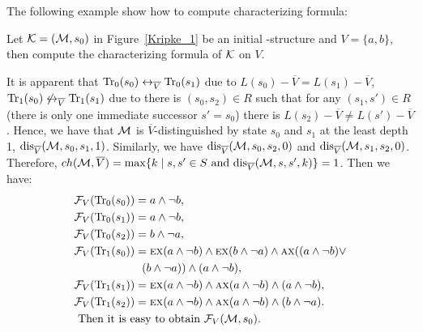 \documentclass{article}
\begin{document}
The following example show how to compute characterizing formula:
\begin{example}
Let ${\cal K} = ({\cal M}, s_0)$ in Figure~\ref{Kripke_1} be an initial \MPK-structure and $V=\{a, b\}$, then compute the characterizing formula of ${\cal K}$ on $V$.

It is apparent that $\textrm{Tr}_0(s_0) \leftrightarrow_{\overline V} \textrm{Tr}_0(s_1)$ due to $L(s_0) - \overline V = L(s_1) - \overline V$, $\textrm{Tr}_1(s_0) \not\leftrightarrow_{\overline V} \textrm{Tr}_1(s_1)$ due to there is $(s_0, s_2)\in R$ such that for any $(s_1, s') \in R$ (there is only one immediate successor $s'=s_0$) there is $L(s_2)- \overline V \neq L(s') - \overline V$. Hence, we have that ${\cal M}$ is $\overline V$-distinguished by state $s_0$ and $s_1$ at the least depth 1, \ie $\textrm{dis}_{\overline V}({\cal M}, s_0, s_1, 1)$. Similarly, we have $\textrm{dis}_{\overline V}({\cal M}, s_0, s_2, 0)$ and $\textrm{dis}_{\overline V}({\cal M}, s_1, s_2, 0)$. Therefore, $ch({\cal M}, \overline V) =  \max\{k\mid s,s'\in S \text{ and } \textrm{dis}_{\overline V}({\cal M},s,s',k)\} = 1$.
Then we have:
\begin{align*}
  & {\cal F}_V(\textrm{Tr}_0(s_0)) = a \wedge \neg b, \\
  & {\cal F}_V(\textrm{Tr}_0(s_1)) = a \wedge \neg b, \\
  & {\cal F}_V(\textrm{Tr}_0(s_2)) = b \wedge \neg a, \\
  & {\cal F}_V(\textrm{Tr}_1(s_0)) = \textsc{e}\textsc{x}(a \wedge \neg b)  \wedge \textsc{e}\textsc{x}(b \wedge \neg a) \wedge \textsc{a}\textsc{x}((a \wedge \neg b) \vee\\
  & \qquad \qquad  \qquad (b \wedge \neg a)) \wedge (a \wedge \neg b), \\
  & {\cal F}_V(\textrm{Tr}_1(s_1)) = \textsc{e}\textsc{x}(a \wedge \neg b)  \wedge \textsc{a}\textsc{x}(a \wedge \neg b) \wedge (a \wedge \neg b), \\
  & {\cal F}_V(\textrm{Tr}_1(s_2)) = \textsc{e}\textsc{x}(a \wedge \neg b)  \wedge \textsc{a}\textsc{x}(a \wedge \neg b) \wedge (b \wedge \neg a).\\
  & \mbox{ Then it is easy to obtain\ } {\cal F}_V({\cal M}, s_0).
\end{align*}


\end{example}
\end{document}
